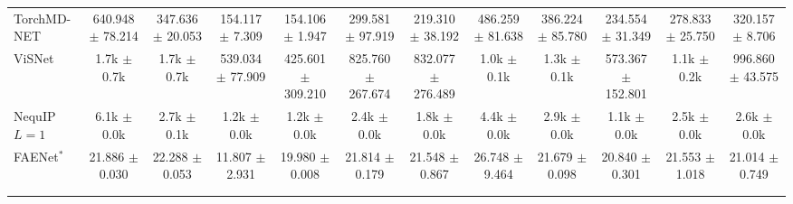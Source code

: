 \begin{table}[h]
{\begin{tabular}{lccccccccccc}
TorchMD-NET & 640.948 $\pm$ 78.214 & 347.636 $\pm$ 20.053 & 154.117 $\pm$ 7.309 & 154.106 $\pm$ 1.947 & 299.581 $\pm$ 97.919 & 219.310 $\pm$ 38.192 & 486.259 $\pm$ 81.638 & 386.224 $\pm$ 85.780 & 234.554 $\pm$ 31.349 & 278.833 $\pm$ 25.750 & 320.157 $\pm$ 8.706 \\
ViSNet & 1.7k $\pm$ 0.7k & 1.7k $\pm$ 0.7k & 539.034 $\pm$ 77.909 & 425.601 $\pm$ 309.210 & 825.760 $\pm$ 267.674 & 832.077 $\pm$ 276.489 & 1.0k $\pm$ 0.1k & 1.3k $\pm$ 0.1k & 573.367 $\pm$ 152.801 & 1.1k $\pm$ 0.2k & 996.860 $\pm$ 43.575 \\
NequIP $L{=}1$ & 6.1k $\pm$ 0.0k & 2.7k $\pm$ 0.1k & 1.2k $\pm$ 0.0k & 1.2k $\pm$ 0.0k & 2.4k $\pm$ 0.0k & 1.8k $\pm$ 0.0k & 4.4k $\pm$ 0.0k & 2.9k $\pm$ 0.0k & 1.1k $\pm$ 0.0k & 2.5k $\pm$ 0.0k & 2.6k $\pm$ 0.0k \\
FAENet$^{\ast}$ & 21.886 $\pm$ 0.030 & 22.288 $\pm$ 0.053 & 11.807 $\pm$ 2.931 & 19.980 $\pm$ 0.008 & 21.814 $\pm$ 0.179 & 21.548 $\pm$ 0.867 & 26.748 $\pm$ 9.464 & 21.679 $\pm$ 0.098 & 20.840 $\pm$ 0.301 & 21.553 $\pm$ 1.018 & 21.014 $\pm$ 0.749 \\
\midrule
\color{gray}{DimeNet++} & \color{gray}{1.2k $\pm$ 0.1k} & \color{gray}{991.164 $\pm$ 223.096} & \color{gray}{278.098 $\pm$ 49.866} & \color{gray}{389.387 $\pm$ 103.601} & \color{gray}{726.850 $\pm$ 80.483} & \color{gray}{608.244 $\pm$ 3.732} & \color{gray}{1.1k $\pm$ 0.1k} & \color{gray}{988.503 $\pm$ 107.070} & \color{gray}{519.458 $\pm$ 69.633} & \color{gray}{1.0k $\pm$ 0.1k} & \color{gray}{776.368 $\pm$ 11.972} \\
\color{gray}{SchNet} & \color{gray}{1.2k $\pm$ 0.1k} & \color{gray}{918.727 $\pm$ 33.117} & \color{gray}{196.534 $\pm$ 20.019} & \color{gray}{97.289 $\pm$ 13.538} & \color{gray}{226.752 $\pm$ 38.836} & \color{gray}{700.782 $\pm$ 58.526} & \color{gray}{1.4k $\pm$ 0.1k} & \color{gray}{1.2k $\pm$ 0.0k} & \color{gray}{627.706 $\pm$ 87.829} & \color{gray}{664.972 $\pm$ 35.163} & \color{gray}{720.170 $\pm$ 4.806} \\
\bottomrule
\end{tabular}%
}


\end{table}
